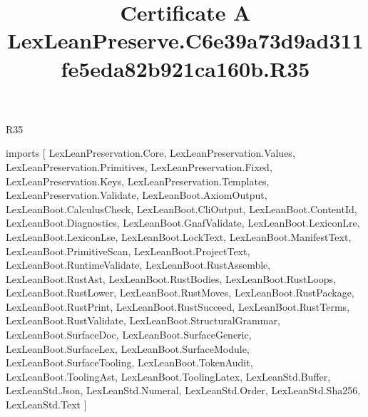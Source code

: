 \begin{lexlean}{R35}
\title{Certificate A LexLeanPreserve.C6e39a73d9ad311fe5eda82b921ca160b.R35}
\begin{coremodule}
imports [
  LexLeanPreservation.Core,
  LexLeanPreservation.Values,
  LexLeanPreservation.Primitives,
  LexLeanPreservation.Fixed,
  LexLeanPreservation.Keys,
  LexLeanPreservation.Templates,
  LexLeanPreservation.Validate,
  LexLeanBoot.AxiomOutput,
  LexLeanBoot.CalculusCheck,
  LexLeanBoot.CliOutput,
  LexLeanBoot.ContentId,
  LexLeanBoot.Diagnostics,
  LexLeanBoot.GnafValidate,
  LexLeanBoot.LexiconLre,
  LexLeanBoot.LexiconLse,
  LexLeanBoot.LockText,
  LexLeanBoot.ManifestText,
  LexLeanBoot.PrimitiveScan,
  LexLeanBoot.ProjectText,
  LexLeanBoot.RuntimeValidate,
  LexLeanBoot.RustAssemble,
  LexLeanBoot.RustAst,
  LexLeanBoot.RustBodies,
  LexLeanBoot.RustLoops,
  LexLeanBoot.RustLower,
  LexLeanBoot.RustMoves,
  LexLeanBoot.RustPackage,
  LexLeanBoot.RustPrint,
  LexLeanBoot.RustSucceed,
  LexLeanBoot.RustTerms,
  LexLeanBoot.RustValidate,
  LexLeanBoot.StructuralGrammar,
  LexLeanBoot.SurfaceDoc,
  LexLeanBoot.SurfaceGeneric,
  LexLeanBoot.SurfaceLex,
  LexLeanBoot.SurfaceModule,
  LexLeanBoot.SurfaceTooling,
  LexLeanBoot.TokenAudit,
  LexLeanBoot.ToolingAst,
  LexLeanBoot.ToolingLatex,
  LexLeanStd.Buffer,
  LexLeanStd.Json,
  LexLeanStd.Numeral,
  LexLeanStd.Order,
  LexLeanStd.Sha256,
  LexLeanStd.Text
]


\end{coremodule}
\end{lexlean}
